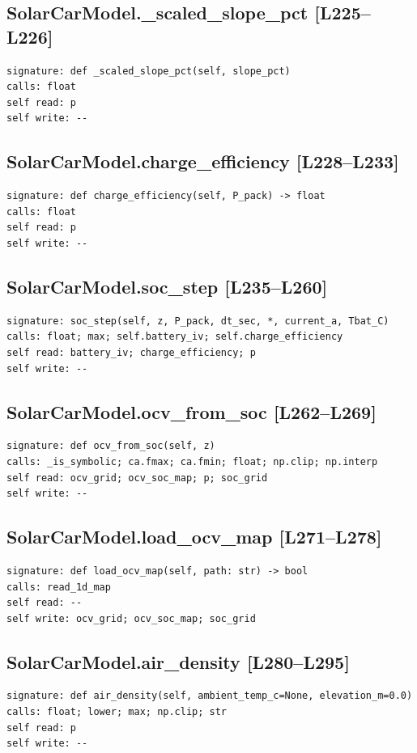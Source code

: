 \documentclass[a4paper,10pt,oneside]{book}
\begin{document}
\subsection*{SolarCarModel.\_scaled\_slope\_pct [L225--L226]}
\begin{lstlisting}[numbers=none]
signature: def _scaled_slope_pct(self, slope_pct)
calls: float
self read: p
self write: --
\end{lstlisting}
\subsection*{SolarCarModel.charge\_efficiency [L228--L233]}
\begin{lstlisting}[numbers=none]
signature: def charge_efficiency(self, P_pack) -> float
calls: float
self read: p
self write: --
\end{lstlisting}
\subsection*{SolarCarModel.soc\_step [L235--L260]}
\begin{lstlisting}[numbers=none]
signature: soc_step(self, z, P_pack, dt_sec, *, current_a, Tbat_C)
calls: float; max; self.battery_iv; self.charge_efficiency
self read: battery_iv; charge_efficiency; p
self write: --
\end{lstlisting}
\subsection*{SolarCarModel.ocv\_from\_soc [L262--L269]}
\begin{lstlisting}[numbers=none]
signature: def ocv_from_soc(self, z)
calls: _is_symbolic; ca.fmax; ca.fmin; float; np.clip; np.interp
self read: ocv_grid; ocv_soc_map; p; soc_grid
self write: --
\end{lstlisting}
\subsection*{SolarCarModel.load\_ocv\_map [L271--L278]}
\begin{lstlisting}[numbers=none]
signature: def load_ocv_map(self, path: str) -> bool
calls: read_1d_map
self read: --
self write: ocv_grid; ocv_soc_map; soc_grid
\end{lstlisting}
\subsection*{SolarCarModel.air\_density [L280--L295]}
\begin{lstlisting}[numbers=none]
signature: def air_density(self, ambient_temp_c=None, elevation_m=0.0)
calls: float; lower; max; np.clip; str
self read: p
self write: --
\end{lstlisting}
\end{document}
